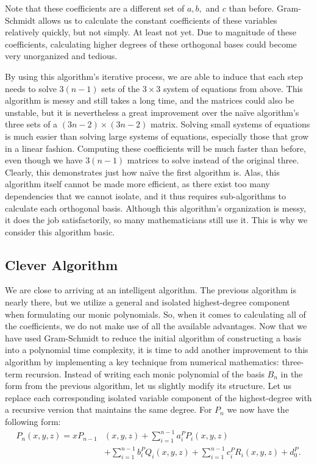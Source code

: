 \documentclass[letterpaper, 12pt]{article}
\begin{document}
\doublespacing
\vspace*{-5mm}
\noindent Note that these coefficients are a different set of $a, b,$ and $c$ than before. Gram-Schmidt allows us to calculate the constant coefficients of these variables relatively quickly, but not simply. At least not yet. Due to magnitude of these coefficients, calculating higher degrees of these orthogonal bases could become very unorganized and tedious. 

By using this algorithm's iterative process, we are able to induce that each step needs to solve $3(n-1)$ sets of the $3\times 3$ system of equations from above. This algorithm is messy and still takes a long time, and the matrices could also be unstable, but it is nevertheless a great improvement over the na\"ive algorithm's three sets of a $(3n-2)\times (3n-2)$ matrix. Solving small systems of equations is much easier than solving large systems of equations, especially those that grow in a linear fashion. Computing these coefficients will be much faster than before, even though we have $3(n-1)$ matrices to solve instead of the original three. Clearly, this demonstrates just how na\"ive the first algorithm is. Alas, this algorithm itself cannot be made more efficient, as there exist too many dependencies that we cannot isolate, and it thus requires sub-algorithms to calculate each orthogonal basis. Although this algorithm's organization is messy, it does the job satisfactorily, so many mathematicians still use it. This is why we consider this algorithm basic.







\newpage
\begin{centering}\section{Clever Algorithm}\end{centering}

We are close to arriving at an intelligent algorithm. The previous algorithm is nearly there, but we utilize a general and isolated highest-degree component when formulating our monic polynomials. So, when it comes to calculating all of the coefficients, we do not make use of all the available advantages. Now that we have used Gram-Schmidt to reduce the initial algorithm of constructing a basis into a polynomial time complexity, it is time to add another improvement to this algorithm by implementing a key technique from numerical mathematics: three-term recursion. Instead of writing each monic polynomial of the basis $B_n$ in the form from the previous algorithm, let us slightly modify its structure. Let us replace each corresponding isolated variable component of the highest-degree with a recursive version that maintains the same degree. For $P_n$ we now have the following form:
\begin{align*}
	P_n(x, y, z) = xP_{n-1}&(x, y, z) + \sum_{i=1}^{n-1} a_i^PP_i(x, y, z)\\ 
					&+ \sum_{i=1}^{n-1} b_i^PQ_i(x, y, z) + \sum_{i=1}^{n-1} c_i^PR_i(x, y, z) + d_0^P.
\end{align*}
\end{document}
